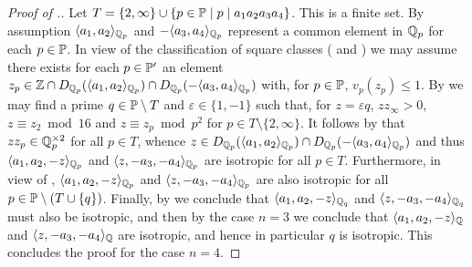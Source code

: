 \documentclass[12pt, leqno, british]{amsart}
\begin{document}
\begin{proof}[Proof of .]
Let $T = \lbrace 2, \infty \rbrace \cup \lbrace p \in \mathbb P \mid p\mid a_1a_2a_3a_4 \rbrace$.
This is a finite set.
By assumption $\langle a_1, a_2 \rangle_{\mathbb Q_p}$ and $-\langle a_3, a_4 \rangle_{\mathbb Q_p}$ represent a common element in $\mathbb Q_p$ for each $p \in \mathbb P$.
In view of the classification of square classes ( and ) we may assume there exists for each $p \in \mathbb P'$ an element $z_p \in \mathbb Z \cap D_{\mathbb Q_p}(\langle a_1, a_2 \rangle_{\mathbb Q_p}) \cap D_{\mathbb Q_p}(-\langle a_3, a_4 \rangle_{\mathbb Q_p})$ with, for $p \in \mathbb P$, $v_p(z_p) \leq 1$.
By  we may find a prime $q \in \mathbb P \setminus T$ and $\varepsilon \in \lbrace 1, -1 \rbrace$ such that, for $z = \varepsilon q$, $z z_\infty > 0$, $z \equiv z_2 \bmod 16$ and $z \equiv z_p \bmod p^2$ for $p \in T \setminus \lbrace 2, \infty \rbrace$.
It follows by  that $z z_p \in \mathbb Q_p^{\times 2}$ for all $p \in T$, whence $z \in  D_{\mathbb Q_p}(\langle a_1, a_2 \rangle_{\mathbb Q_p}) \cap D_{\mathbb Q_p}(-\langle a_3, a_4 \rangle_{\mathbb Q_p})$ and thus $\langle a_1, a_2, -z \rangle_{\mathbb Q_p}$ and $\langle z, -a_3, -a_4 \rangle_{\mathbb Q_p}$ are isotropic for all $p \in T$.
Furthermore, in view of , $\langle a_1, a_2, -z \rangle_{\mathbb Q_p}$ and $\langle z, -a_3, -a_4 \rangle_{\mathbb Q_p}$ are also isotropic for all $p \in \mathbb P \setminus (T \cup \lbrace q \rbrace)$.
Finally, by  we conclude that $\langle a_1, a_2, -z \rangle_{\mathbb Q_q}$ and $\langle z, -a_3, -a_4 \rangle_{\mathbb Q_q}$ must also be isotropic, and then by the case $n = 3$ we conclude that $\langle a_1, a_2, -z \rangle_{\mathbb Q}$ and $\langle z, -a_3, -a_4 \rangle_{\mathbb Q}$ are isotropic, and hence in particular $q$ is isotropic.
This concludes the proof for the case $n = 4$.


\end{proof}
\end{document}
